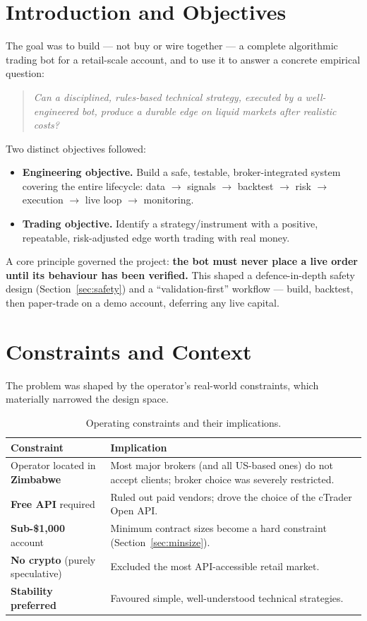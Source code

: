 \documentclass[11pt,a4paper]{article}
\begin{document}
\section{Introduction and Objectives}
The goal was to build --- not buy or wire together --- a complete algorithmic trading bot for a retail-scale account, and to use it to answer a concrete empirical question:
\begin{quote}
\emph{Can a disciplined, rules-based technical strategy, executed by a well-engineered bot, produce a durable edge on liquid markets after realistic costs?}
\end{quote}
Two distinct objectives followed:
\begin{itemize}[leftmargin=1.4em]
  \item \textbf{Engineering objective.} Build a safe, testable, broker-integrated system covering the entire lifecycle: data $\to$ signals $\to$ backtest $\to$ risk $\to$ execution $\to$ live loop $\to$ monitoring.
  \item \textbf{Trading objective.} Identify a strategy/instrument with a positive, repeatable, risk-adjusted edge worth trading with real money.
\end{itemize}
A core principle governed the project: \textbf{the bot must never place a live order until its behaviour has been verified.} This shaped a defence-in-depth safety design (Section~\ref{sec:safety}) and a ``validation-first'' workflow --- build, backtest, then paper-trade on a demo account, deferring any live capital.

\section{Constraints and Context}
The problem was shaped by the operator's real-world constraints, which materially narrowed the design space.

\begin{table}[ht]\centering
\caption{Operating constraints and their implications.}
\begin{tabular}{@{}p{5.3cm}p{8.2cm}@{}}
\toprule
\textbf{Constraint} & \textbf{Implication} \\
\midrule
Operator located in \textbf{Zimbabwe} & Most major brokers (and all US-based ones) do not accept clients; broker choice was severely restricted. \\
\textbf{Free API} required & Ruled out paid vendors; drove the choice of the cTrader Open API. \\
\textbf{Sub-\$1{,}000} account & Minimum contract sizes become a hard constraint (Section~\ref{sec:minsize}). \\
\textbf{No crypto} (purely speculative) & Excluded the most API-accessible retail market. \\
\textbf{Stability preferred} & Favoured simple, well-understood technical strategies. \\
\bottomrule
\end{tabular}
\end{table}
\end{document}
